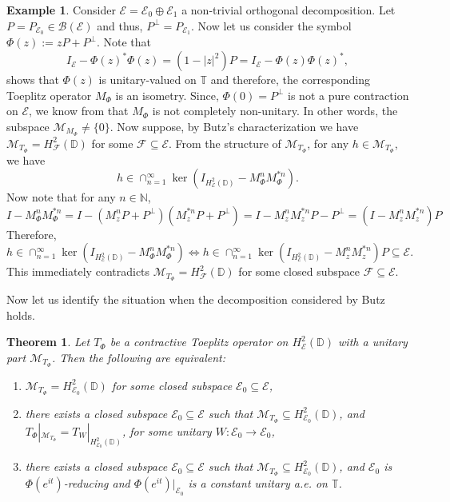 \documentclass[12pt]{amsart}
\numberwithin{equation}{section}
\newtheorem{thm}[propn]{Theorem}
\theoremstyle{definition}
\newtheorem*{example}{Example}
\newcommand{\Nat}{\mathbb{N}}
\newcommand{\D}{\mathbb{D}}
\newcommand{\T}{\mathbb{T}}
\newcommand{\1}{{\mbox{\bf 1}}}
\newcommand{\clb}{\mathcal{B}}
\newcommand{\cle}{\mathcal{E}}
\newcommand{\clf}{\mathcal{F}}
\newcommand{\clm}{\mathcal{M}}
\newcommand{\raro}{\rightarrow}
\begin{document}
\begin{example}
Consider $\cle = \cle_0 \oplus \cle_1$ a non-trivial orthogonal decomposition. Let $P = P_{\cle_0} \in \clb(\cle)$ and thus, $P^{\perp} = P_{\cle_1}$.  Now let us consider the symbol $\Phi(z):= zP+P^{\perp}$. Note that 
\[
I_{\cle} - \Phi(z)^* \Phi(z) = (1 - |z|^2)P = I_{\cle} - \Phi(z) \Phi(z)^*,
\]
shows that $\Phi(z)$ is unitary-valued on $\T$ and therefore, the corresponding Toeplitz operator $M_{\Phi}$ is an isometry. Since, $\Phi(0) = P^{\perp}$ is not a pure contraction on $\cle$, we know from \cite[Theorem 3.4]{Sarkar} that $M_{\Phi}$ is not completely non-unitary. In other words, the subspace $\clm_{M_{\Phi}} \neq \{0\}$. Now suppose, by Butz's characterization we have $\clm_{T_{\Phi}} = H_{\clf}^2(\D)$ for some $\clf \subseteq \cle$. From the structure of $\clm_{T_{\Phi}}$, for any $h \in \clm_{T_{\Phi}}$, we have
\[
h \in \cap_{n=1}^{\infty} \ker (I_{H_{\cle}^2(\D)} - M_{\Phi}^n M_{\Phi}^{*n}).
\]
Now note that for any $n \in \Nat$,
\[
I  - M_{\Phi}^n M_{\Phi}^{*n} = I - (M_z^n P + P^{\perp})(M_z^{*n} P + P^{\perp}) =  I - M_z^n M_z^{*n} P - P^{\perp} = (I - M_z^n M_z^{*n}) P
\]
Therefore, 
\[
h \in \cap_{n=1}^{\infty} \ker (I_{H_{\cle}^2(\D)} - M_{\Phi}^n M_{\Phi}^{*n}) \Longleftrightarrow h \in \cap_{n=1}^{\infty} \ker (I_{H_{\cle}^2(\D)} - M_z^n M_z^{*n}) P \subseteq \cle.
\]
This immediately contradicts $\clm_{T_{\Phi}} = H_{\clf}^2(\D)$ for some closed subspace $\clf \subseteq \cle$.
\end{example}
Now let us identify the situation when the decomposition considered by Butz holds.
\begin{thm}\label{Butzcorrect}
Let $T_{\Phi}$ be a contractive Toeplitz operator on $H_{\cle}^2(\D)$ with a unitary part $\clm_{T_{\Phi}}$. Then the following are equivalent:
\begin{enumerate}
\item[(i)] $\clm_{T_{\Phi}} = H_{\cle_0}^2(\D)$ for some closed subspace $\cle_0 \subseteq \cle$,
\item[(ii)] there exists a closed subspace $\cle_0 \subseteq \cle$ such that $\clm_{T_{\Phi}} \subseteq H_{\cle_0}^2(\D)$, and $T_{\Phi}|_{\clm_{T_{\Phi}}} = T_W|_{H_{\cle_0}^2(\D)}$, for some unitary $W: \cle_0 \raro \cle_0$,
\item[(iii)] there exists a closed subspace $\cle_0 \subseteq \cle$ such that $\clm_{T_{\Phi}} \subseteq H_{\cle_0}^2(\D)$, and $\cle_0$ is $\Phi(e^{it})$-reducing and $\Phi(e^{it})|_{\cle_0}$ is a constant unitary a.e. on $\T$.
\end{enumerate}
\end{thm}
\end{document}
